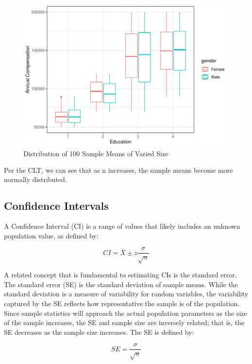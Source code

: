\documentclass[]{book}
\begin{document}
\begin{figure}

{\centering \includegraphics{_main_files/figure-latex/unnamed-chunk-13-1} 

}

\caption{Distribution of 100 Sample Means of Varied Size}\label{fig:unnamed-chunk-13}
\end{figure}

Per the CLT, we can see that as n increases, the sample means become more normally distributed.

\hypertarget{confidence-intervals}{%
\subsection{Confidence Intervals}\label{confidence-intervals}}

A Confidence Interval (CI) is a range of values that likely includes an unknown population value, as defined by:

\[ CI = \bar{X} \pm z \frac{\sigma}{\sqrt{n}} \]

A related concept that is fundamental to estimating CIs is the standard error. The standard error (SE) is the standard deviation of sample means. While the standard deviation is a measure of variability for random variables, the variability captured by the SE reflects how representative the sample is of the population. Since sample statistics will approach the actual population parameters as the size of the sample increases, the SE and sample size are inversely related; that is, the SE decreases as the sample size increases. The SE is defined by:

\[ SE = \frac{\sigma}{\sqrt{n}} \]
\end{document}
